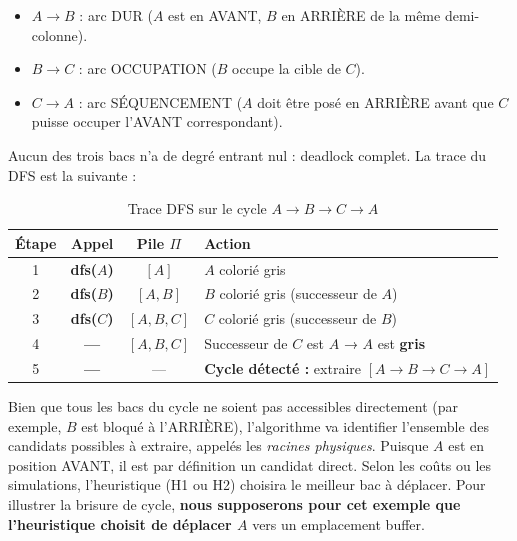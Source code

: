 \documentclass[12pt,a4paper]{article}
\begin{document}
\begin{itemize}[noitemsep]
  \item $A \to B$ : arc DUR ($A$ est en AVANT, $B$ en ARRIÈRE de la
        même demi-colonne).
  \item $B \to C$ : arc OCCUPATION ($B$ occupe la cible de $C$).
  \item $C \to A$ : arc SÉQUENCEMENT ($A$ doit être posé en ARRIÈRE
        avant que $C$ puisse occuper l'AVANT correspondant).
\end{itemize}

Aucun des trois bacs n'a de degré entrant nul : deadlock complet.
La trace du DFS est la suivante :

\begin{table}[H]
\centering
\renewcommand{\arraystretch}{1.3}
\begin{tabular}{c >{\bfseries}c c l}
\toprule
Étape & Appel & Pile $\Pi$ & Action \\
\midrule
1 & dfs($A$) & $[A]$ & $A$ colorié gris \\
2 & dfs($B$) & $[A, B]$ & $B$ colorié gris (successeur de $A$) \\
3 & dfs($C$) & $[A, B, C]$ & $C$ colorié gris (successeur de $B$) \\
4 & — & $[A, B, C]$ & Successeur de $C$ est $A$ → $A$ est \textbf{gris} \\
5 & — & — & \textbf{Cycle détecté :} extraire $[A \to B \to C \to A]$ \\
\bottomrule
\end{tabular}
\caption{Trace DFS sur le cycle $A \to B \to C \to A$}
\end{table}

Bien que tous les bacs du cycle ne soient pas accessibles directement (par exemple, $B$ est bloqué à l'ARRIÈRE), l'algorithme va identifier l'ensemble des candidats possibles à extraire, appelés les \emph{racines physiques}. Puisque $A$ est en position AVANT, il est par définition un candidat direct. Selon les coûts ou les simulations, l'heuristique (H1 ou H2) choisira le meilleur bac à déplacer. Pour illustrer la brisure de cycle, \textbf{nous supposerons pour cet exemple que l'heuristique choisit de déplacer $A$} vers un emplacement buffer.
\end{document}
